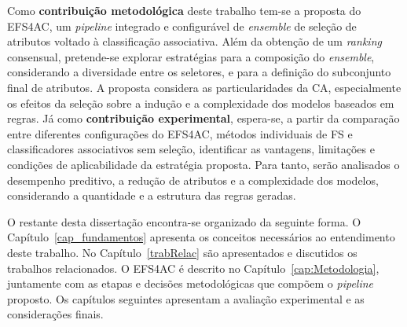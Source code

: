 Como \textbf{contribuição metodológica} deste trabalho tem-se a proposta do EFS4AC, um \textit{pipeline} integrado e configurável de \textit{ensemble} de seleção de atributos voltado à classificação associativa. Além da obtenção de um \textit{ranking} consensual, pretende-se explorar estratégias para a composição do \textit{ensemble}, considerando a diversidade entre os seletores, e para a definição do subconjunto final de atributos. A proposta considera as particularidades da CA, especialmente os efeitos da seleção sobre a indução e a complexidade dos modelos baseados em regras. Já como \textbf{contribuição experimental}, espera-se, a partir da comparação entre diferentes configurações do EFS4AC, métodos individuais de FS e classificadores associativos sem seleção, identificar as vantagens, limitações e condições de aplicabilidade da estratégia proposta. Para tanto, serão analisados o desempenho preditivo, a redução de atributos e a complexidade dos modelos, considerando a quantidade e a estrutura das regras geradas.

O restante desta dissertação encontra-se organizado da seguinte forma. O Capítulo~\ref{cap_fundamentos} apresenta os conceitos necessários ao entendimento deste trabalho. No Capítulo~\ref{trabRelac} são apresentados e discutidos os trabalhos relacionados. O EFS4AC é descrito no Capítulo~\ref{cap:Metodologia}, juntamente com as etapas e decisões metodológicas que compõem o \textit{pipeline} proposto. Os capítulos seguintes apresentam a avaliação experimental e as considerações finais.
